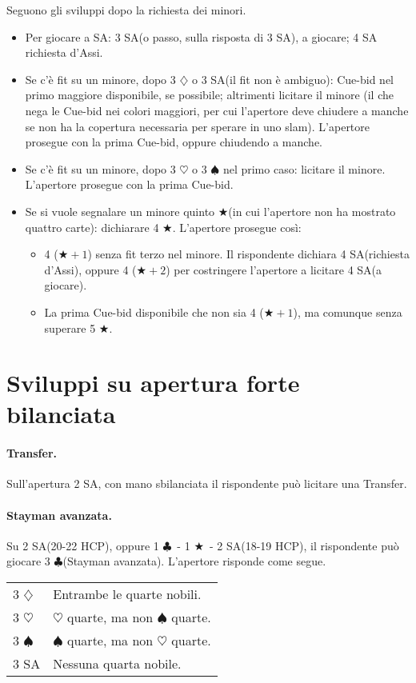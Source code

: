 \documentclass[a4paper,10pt]{article}
\renewcommand{\c}{$\clubsuit$\xspace}
\renewcommand{\d}{$\diamondsuit$\xspace}
\newcommand{\h}{$\heartsuit$\xspace}
\newcommand{\s}{$\spadesuit$\xspace}
\renewcommand{\j}{$\bigstar$\xspace}
\newcommand{\sa}{SA\xspace}
\newcommand{\smallspace}{\vskip0.3cm}
\newenvironment{twocol}
  {\smallspace\noindent\begin{tabular}{l p{0.8\textwidth}}}
  {\end{tabular}\smallspace}
\begin{document}
\noindent Seguono gli sviluppi dopo la richiesta dei minori.
\begin{itemize}
 \item Per giocare a \sa: 3 \sa (o passo, sulla risposta di 3 \sa), a giocare; 4 \sa richiesta d'Assi.
 \item Se c'è fit su un minore, dopo 3 \d o 3 \sa (il fit non è ambiguo): Cue-bid nel primo maggiore disponibile, se possibile; altrimenti licitare il minore (il che nega le Cue-bid nei colori maggiori, per cui l'apertore deve chiudere a manche se non ha la copertura necessaria per sperare in uno slam).
 L'apertore prosegue con la prima Cue-bid, oppure chiudendo a manche.
 \item Se c'è fit su un minore, dopo 3 \h o 3 \s nel primo caso: licitare il minore.
 L'apertore prosegue con la prima Cue-bid.
 \item Se si vuole segnalare un minore quinto \j (in cui l'apertore non ha mostrato quattro carte): dichiarare 4 \j.
 L'apertore prosegue così:
 \begin{itemize}
  \item 4 ($\bigstar+1$) senza fit terzo nel minore. Il rispondente dichiara 4 \sa (richiesta d'Assi), oppure 4 ($\bigstar+2$) per costringere l'apertore a licitare 4 \sa (a giocare).
  \item La prima Cue-bid disponibile che non sia 4 ($\bigstar+1$), ma comunque senza superare 5 \j.
  
 \end{itemize}
\end{itemize}

\pagebreak

\section{Sviluppi su apertura forte bilanciata}

\paragraph{Transfer.} Sull'apertura 2 \sa, con mano sbilanciata il rispondente può licitare una Transfer.

\paragraph{Stayman avanzata.} Su 2 \sa (20-22 HCP), oppure 1 \c\ - 1 \j\ - 2 \sa (18-19 HCP), il rispondente può giocare 3 \c (Stayman avanzata). L'apertore risponde come segue.
\begin{twocol}
 3 \d & Entrambe le quarte nobili.\\
 3 \h & \h quarte, ma non \s quarte.\\
 3 \s & \s quarte, ma non \h quarte.\\
 3 \sa & Nessuna quarta nobile.
\end{twocol}
\end{document}
